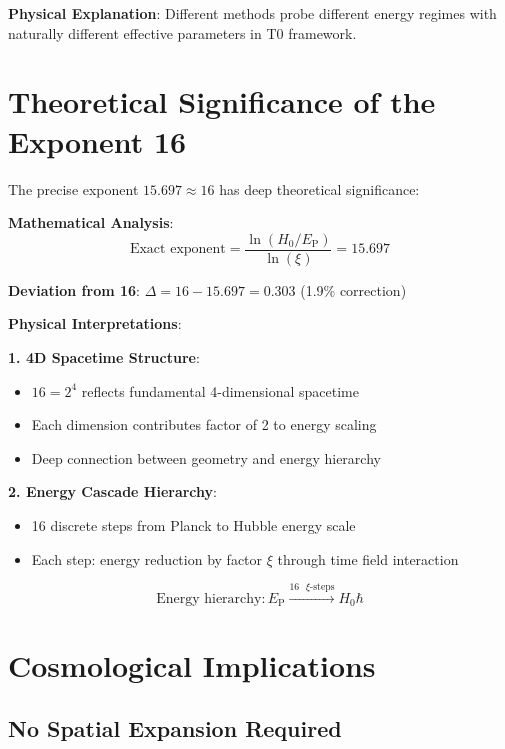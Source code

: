 \documentclass[12pt,a4paper]{article}
\newcommand{\EP}{E_{\text{P}}}
\begin{document}
	\textbf{Physical Explanation}: Different methods probe different energy regimes with naturally different effective parameters in T0 framework.
	
	\section{Theoretical Significance of the Exponent 16}
	
	The precise exponent $15.697 \approx 16$ has deep theoretical significance:
	
	\textbf{Mathematical Analysis}:
	\begin{equation}
		\text{Exact exponent} = \frac{\ln(H_0/\EP)}{\ln(\xi)} = 15.697
	\end{equation}
	
	\textbf{Deviation from 16}: $\Delta = 16 - 15.697 = 0.303$ (1.9\% correction)
	
	\textbf{Physical Interpretations}:
	
	\textbf{1. 4D Spacetime Structure}:
	\begin{itemize}
		\item $16 = 2^4$ reflects fundamental 4-dimensional spacetime
		\item Each dimension contributes factor of 2 to energy scaling
		\item Deep connection between geometry and energy hierarchy
	\end{itemize}
	
	\textbf{2. Energy Cascade Hierarchy}:
	\begin{itemize}
		\item 16 discrete steps from Planck to Hubble energy scale
		\item Each step: energy reduction by factor $\xi$ through time field interaction
	\end{itemize}
	
	\begin{equation}
		\boxed{\text{Energy hierarchy}: \EP \xrightarrow{16 \text{ } \xi\text{-steps}} H_0 \hbar}
		\label{eq:energy_hierarchy_16}
	\end{equation}
	
	\section{Cosmological Implications}
	
	\subsection{No Spatial Expansion Required}
	
\end{document}

